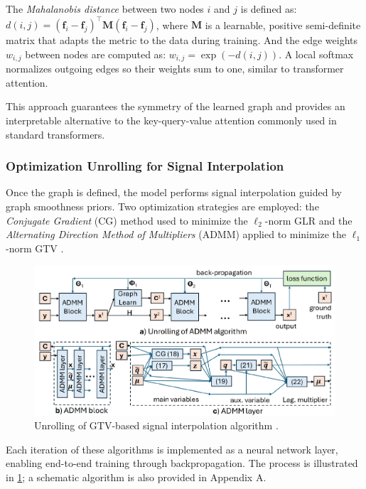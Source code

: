 \documentclass{article}
\theoremstyle{plain}
\theoremstyle{definition}
\theoremstyle{remark}
\begin{document}
The \textit{Mahalanobis distance} between two nodes $i$ and $j$ is defined as: $d(i, j) = (\mathbf{f}_i - \mathbf{f}_j)^\top \mathbf{M} (\mathbf{f}_i - \mathbf{f}_j)$, where $\mathbf{M}$ is a learnable, positive semi-definite matrix that adapts the metric to the data during training. And the edge weights $w_{i,j}$ between nodes are computed as: $w_{i,j} = \exp(-d(i,j)).$ A local softmax normalizes outgoing edges so their weights sum to one, similar to transformer attention.

This approach guarantees the symmetry of the learned graph and provides an interpretable alternative to the key-query-value attention commonly used in standard transformers.

\subsubsection{Optimization Unrolling for Signal Interpolation}

Once the graph is defined, the model performs signal interpolation guided by graph smoothness priors. Two optimization strategies are employed: the \textit{Conjugate Gradient} (CG) method used to minimize the $\ell_2$-norm GLR \cite{shewchuk1994introduction} and the \textit{Alternating Direction Method of Multipliers} (ADMM) applied to minimize the $\ell_1$-norm GTV \cite{wang2017new}.

\begin{figure}[ht]
\vskip -0.1in
\begin{center}
\centerline{\includegraphics[width=0.9\columnwidth]{GTV-based_algorithm.png}}
\caption{Unrolling of GTV-based signal interpolation algorithm \cite{do2024interpretable}.}
\label{fig:unrolling-gtv}
\end{center}
\vskip -0.3in
\end{figure}

Each iteration of these algorithms is implemented as a neural network layer, enabling end-to-end training through backpropagation. The process is illustrated in \cref{fig:unrolling-gtv}; a schematic algorithm is also provided in Appendix A.
\end{document}
